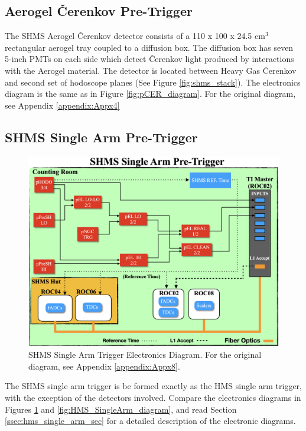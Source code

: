 \documentclass[11pt]{article}
\begin{document}
\subsection{Aerogel \v{C}erenkov Pre-Trigger}
\indent The SHMS Aerogel \v{C}erenkov detector consists of a 110 x 100 x 24.5 cm$^{3}$ rectangular aerogel tray coupled to a diffusion box. The diffusion box has seven 5-inch PMTs on each side
which detect \v{C}erenkov light produced by interactions with the Aerogel material\cite{shms_aero_article}. The detector is located between Heavy Gas \v{C}erenkov and second set of hodoscope planes
(See Figure \ref{fig:shms_stack}). The electronics diagram is the same as in Figure \ref{fig:pCER_diagram}. For the original diagram, see Appendix \ref{appendix:Appx4}
\newpage
\subsection{SHMS Single Arm Pre-Trigger}
\begin{figure}[h!]
  \centering
  \includegraphics[scale=0.35]{images/SHMS_SingleArm_diagram.png}
  \caption{SHMS Single Arm Trigger Electronics Diagram. For the original diagram, see Appendix \ref{appendix:Appx8}.}
  \label{fig:SHMS_SingleArm_diagram}
\end{figure}

\indent The SHMS single arm trigger is be formed exactly as the HMS single arm trigger, with the exception of the detectors involved. Compare the electronics diagrams in Figures \ref{fig:SHMS_SingleArm_diagram} and
\ref{fig:HMS_SingleArm_diagram}, and read Section \ref{ssec:hms_single_arm_sec} for a detailed description of the electronic diagrams. 
\newpage
\end{document}
